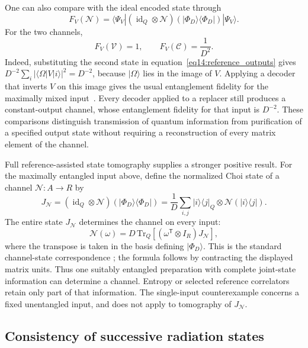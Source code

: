 \documentclass[11pt,letterpaper]{article}
\theoremstyle{plain}
\theoremstyle{definition}
\theoremstyle{remark}
\newcommand{\Ccal}{\mathcal{C}}
\newcommand{\Ncal}{\mathcal{N}}
\newcommand{\Vcal}{\mathcal{V}}
\begin{document}
One can also compare with the ideal encoded state through
\begin{equation}
 F_V(\Ncal)=\langle\Psi_V|
 (\operatorname{id}_Q\otimes\Ncal)
 (|\Phi_D\rangle\langle\Phi_D|)|\Psi_V\rangle.
 \label{eq14:encoding_fidelity}
\end{equation}
For the two channels,
\begin{equation}
 F_V(\Vcal)=1,
 \qquad F_V(\Ccal)=\frac1{D^2}.
 \label{eq14:reference_fidelities}
\end{equation}
Indeed, substituting the second state in
equation~\eqref{eq14:reference_outputs} gives
$D^{-2}\sum_i|\langle\Omega|V|i\rangle|^2=D^{-2}$, because
$|\Omega\rangle$ lies in the image of $V$. Applying a decoder that
inverts $V$ on this image gives the usual entanglement fidelity for
the maximally mixed input~\citep{schumacher1996}. Every decoder applied
to a replacer still produces a constant-output channel, whose
entanglement fidelity for that input is $D^{-2}$. These comparisons
distinguish transmission of quantum information from purification of a
specified output state without requiring a reconstruction of every
matrix element of the channel.

Full reference-assisted state tomography supplies a stronger positive
result. For the maximally entangled input above, define the normalized
Choi state of a channel $\Ncal:A\to R$ by
\begin{equation}
 J_{\Ncal}=(\operatorname{id}_Q\otimes\Ncal)
 (|\Phi_D\rangle\langle\Phi_D|)
 =\frac1D\sum_{i,j}|i\rangle\langle j|_Q
       \otimes\Ncal(|i\rangle\langle j|).
 \label{eq14:choi_state}
\end{equation}
The entire state $J_{\Ncal}$ determines the channel on every input:
\begin{equation}
 \Ncal(\omega)=D\,\mathrm{Tr}_Q
       [(\omega^{\mathsf T}\otimes I_R)J_{\Ncal}],
 \label{eq14:choi_inversion}
\end{equation}
where the transpose is taken in the basis defining $|\Phi_D\rangle$.
This is the standard channel-state correspondence \cite{choi1975}; the
formula follows by contracting the displayed matrix units. Thus one
suitably entangled preparation with complete joint-state information
can determine a channel. Entropy or selected reference correlators
retain only part of that information. The single-input counterexample
concerns a fixed unentangled input, and does not apply to tomography of
$J_{\Ncal}$.

\subsection{Consistency of successive radiation states}
\label{subsec14:nested_channels}
\end{document}
